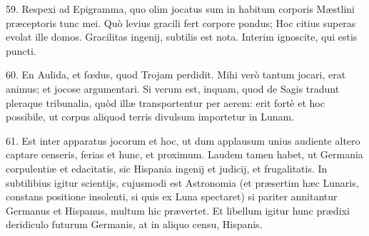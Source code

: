 \documentclass[a4paper, 11pt, oneside, polutonikogreek, german]{article}
\begin{document}
59. Respexi ad Epigramma, quo olim jocatus sum in habitum corporis Mæstlini præceptoris tunc mei. Quò levius gracili fert corpore pondus; Hoc citius superas evolat ille domos. Gracilitas ingenij, subtilis est nota. Interim ignoscite, qui estis puncti.

60. En Aulida, et fœdus, quod Trojam perdidit. Mihi verò tantum jocari, erat animus; et jocose argumentari. Si verum est, inquam, quod de Sagis tradunt pleraque tribunalia, quòd illæ transportentur per aerem: erit fortè et hoc possibile, ut corpus aliquod terris divulsum importetur in Lunam.

61. Est inter apparatus jocorum et hoc, ut dum applausum unius audiente altero captare censeris, ferias et hunc, et proximum. Laudem tamen habet, ut Germania corpulentiæ et edacitatis, sic Hispania ingenij et judicij, et frugalitatis. In subtilibius igitur scientijs, cujusmodi est Astronomia (et præsertim hæc Lunaris, constans positione insolenti, si quis ex Luna spectaret) si pariter annitantur Germanus et Hispanus, multum hic prævertet. Et libellum igitur hunc prædixi deridiculo futurum Germanis, at in aliquo censu, Hispanis.
\end{document}
